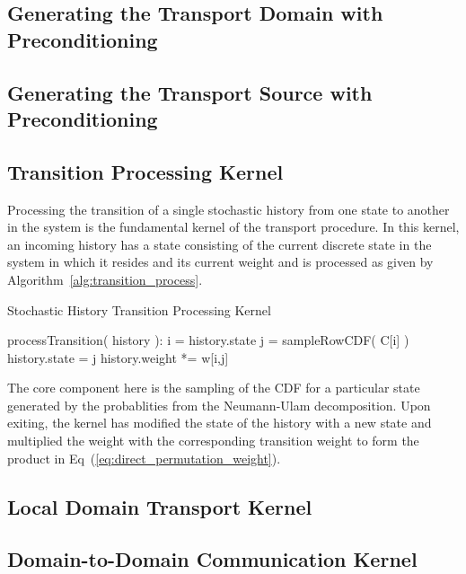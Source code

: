 \subsection{Generating the Transport Domain with Preconditioning}
\label{subsec:domain_generation}

\subsection{Generating the Transport Source with Preconditioning}
\label{subsec:source_generation}

\subsection{Transition Processing Kernel}
\label{subsec:transition_processing}
Processing the transition of a single stochastic history from one
state to another in the system is the fundamental kernel of the
transport procedure. In this kernel, an incoming history has a state
consisting of the current discrete state in the system in which it
resides and its current weight and is processed as given by
Algorithm~\ref{alg:transition_process}.
\begin{algorithm}[h!]
  \caption{Stochastic History Transition Processing Kernel}
  \label{alg:power_iteration}
  \begin{algorithmic}
    \State processTransition( history ):
    \State i = history.state
    \State j = sampleRowCDF( C[i] )
    \State history.state = j
    \State history.weight *= w[i,j]
  \end{algorithmic}
  \label{alg:transition_process}
\end{algorithm}
The core component here is the sampling of the CDF for a particular
state generated by the probablities from the Neumann-Ulam
decomposition. Upon exiting, the kernel has modified the state of the
history with a new state and multiplied the weight with the
corresponding transition weight to form the product in
Eq~(\ref{eq:direct_permutation_weight}).

\subsection{Local Domain Transport Kernel}
\label{subsec:local_domain_transport}

\subsection{Domain-to-Domain Communication Kernel}
\label{subsec:domain_to_domain_kernel}

